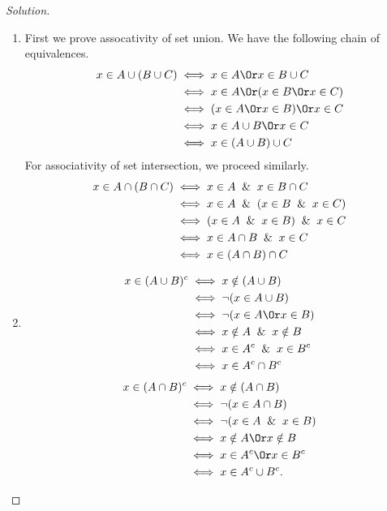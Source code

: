 \documentclass[12pt]{article}
\theoremstyle{definition}
\theoremstyle{plain}
\newenvironment{solution}
  {\begin{proof}[Solution]}
  {\end{proof}}
\begin{document}
\begin{enumerate}
\begin{solution}
\begin{enumerate}
	\item First we prove assocativity of set union. We have the following chain of equivalences.
		\begin{align*}
			x \in A \cup (B \cup C) &\iff x \in A  \Or  x \in B \cup C \\
			& \iff x \in A \Or (x \in B \Or x \in C)\\
			& \iff (x \in A \Or x \in B ) \Or x \in C\\
			& \iff x \in A \cup B \Or x \in C\\
			& \iff x \in (A \cup B) \cup C
		\end{align*}
		For associativity of set intersection, we proceed similarly.
		\begin{align*}
			x \in A \cap (B \cap C) &\iff x \in A  \And  x \in B \cap C \\
			& \iff x \in A \And (x \in B \And x \in C)\\
			& \iff (x \in A \And x \in B ) \And x \in C\\
			& \iff x \in A \cap B \And x \in C\\
			& \iff x \in (A \cap B) \cap C
		\end{align*}
		
	\item \begin{align*}
			x \in (A \cup B)^c & \iff x \notin (A \cup B)\\
			&\iff \neg (x \in A \cup B)\\
			&\iff \neg (x \in A \Or x \in B)\\
			&\iff x \notin A \And x \notin B\\
			&\iff x \in A^c \And x \in B^c\\
			&\iff x \in A^c \cap B^c
		\end{align*}
		\begin{align*}
			x \in (A \cap B)^c & \iff x \notin (A \cap B)\\
			&\iff \neg (x \in A \cap B)\\
			&\iff \neg (x \in A \And x \in B)\\
			&\iff x \notin A \Or x \notin B\\
			&\iff x \in A^c \Or x \in B^c\\
			&\iff x \in A^c \cup B^c.
		\end{align*}
	\end{enumerate}
	\end{solution}
	

\end{enumerate}
\end{document}

